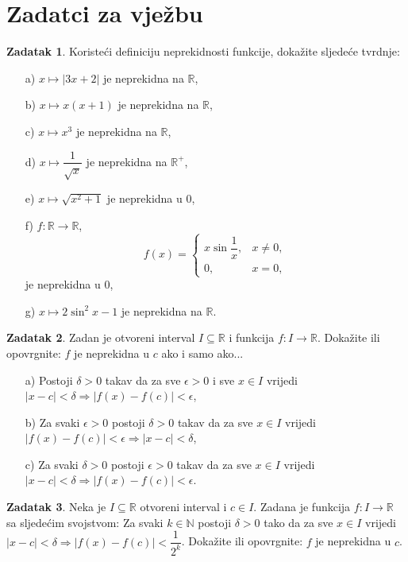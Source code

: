 \documentclass{book}
\theoremstyle{definition}
\theoremstyle{definition}
\newtheorem{exercise}{Zadatak}
\theoremstyle{remark}
\begin{document}
\section*{Zadatci za vježbu}
\begin{exercise}
Koristeći definiciju neprekidnosti funkcije, dokažite sljedeće tvrdnje: 
\begin{itemize}
\item[a)] $x\mapsto |3x+2|$ je neprekidna na $\mathbb{R}$,
\item[b)] $x\mapsto x(x+1)$ je neprekidna na $\mathbb{R}$,
\item[c)] $x\mapsto x^3$ je neprekidna na $\mathbb{R}$,
\item[d)] $x\mapsto \dfrac{1}{\sqrt{x}}$ je neprekidna na $\mathbb{R}^+$,
\item[e)] $x\mapsto \sqrt{x^2+1}$ je neprekidna u $0$,
\item[f)] $f : \mathbb{R}\to \mathbb{R}$, $$f(x)=\begin{cases}
x\sin{\dfrac{1}{x}}, & x\neq 0,\\
0, & x=0,
\end{cases}
$$ 
je neprekidna u $0$,
\item[g)] $x\mapsto 2\sin^2{x}-1$ je neprekidna na $\mathbb{R}$.
\end{itemize}
\end{exercise}
\begin{exercise}
Zadan je otvoreni interval $I\subseteq \mathbb{R}$ i funkcija $f : I\to \mathbb{R}$. Dokažite ili opovrgnite: $f$ je neprekidna u $c$ ako i samo ako...
\begin{itemize}
\item[a)] Postoji $\delta>0$ takav da za sve $\epsilon>0$ i sve $x\in I$ vrijedi $|x-c|<\delta\Rightarrow |f(x)-f(c)|<\epsilon$,
\item[b)] Za svaki $\epsilon>0$ postoji $\delta>0$ takav da za sve $x\in I$ vrijedi $|f(x)-f(c)|<\epsilon\Rightarrow |x-c|<\delta$,
\item[c)] Za svaki $\delta>0$ postoji $\epsilon>0$ takav da za sve $x\in I$ vrijedi $|x-c|<\delta\Rightarrow |f(x)-f(c)|<\epsilon$.
\end{itemize}
\end{exercise}
\begin{exercise}
Neka je $I\subseteq \mathbb{R}$ otvoreni interval i $c\in I$. Zadana je funkcija $f : I\to \mathbb{R}$ sa sljedećim svojstvom: Za svaki $k\in \mathbb{N}$ postoji $\delta>0$ tako da za sve $x\in I$ vrijedi $|x-c|<\delta\Rightarrow |f(x)-f(c)|<\dfrac{1}{2^k}$. Dokažite ili opovrgnite: $f$ je neprekidna u $c$.
\end{exercise}
\end{document}
